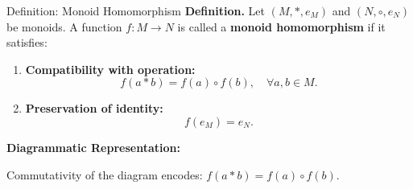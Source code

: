 
\date{15 October 2025}



\begin{frame}
  \cmctitleframe
\end{frame}

\begin{frame}{Definition: Monoid Homomorphism}
\textbf{Definition.}  
Let $(M, *, e_M)$ and $(N, \circ, e_N)$ be monoids.  
A function \( f: M \to N \) is called a \textbf{monoid homomorphism} if it satisfies:

\begin{enumerate}
    \item \textbf{Compatibility with operation:}
    \[
        f(a * b) = f(a) \circ f(b), \quad \forall a,b \in M.
    \]
    \item \textbf{Preservation of identity:}
    \[
        f(e_M) = e_N.
    \]
\end{enumerate}

\textbf{Diagrammatic Representation:}
\centering
{}
Commutativity of the diagram encodes: \( f(a*b) = f(a)\circ f(b). \)
\end{frame}

